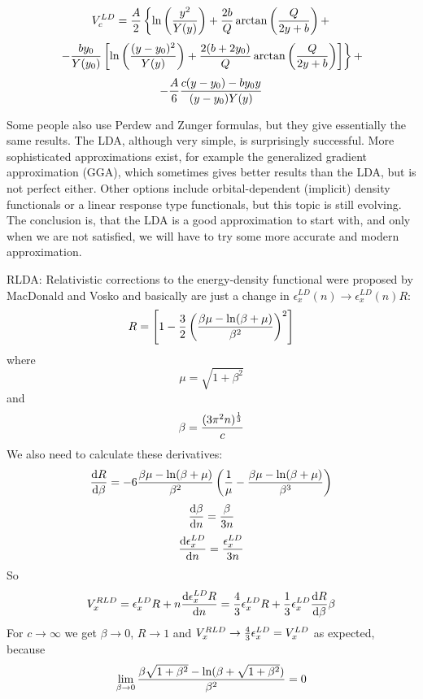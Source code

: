 \begin{equation*}
  V_c^{LD}={A\over2}\left\{ \ln\left(y^2\over Y(y)\right)+{2b\over Q}\arctan\left(Q\over 2y+b\right)+ \right.
\end{equation*}
\begin{equation*}
  \left. -{by_0\over Y(y_0)}\left[\ln\left((y-y_0)^2\over Y(y)\right) +{2(b+2y_0)\over Q}\arctan\left(Q\over 2y+b\right) \right] \right\}+
\end{equation*}
\begin{equation*}
  -{A\over6}{c(y-y_0)-by_0y\over (y-y_0)Y(y)}
\end{equation*}

Some people also use Perdew and Zunger formulas, but they give essentially the same results. The LDA, although very simple, is surprisingly successful. More sophisticated approximations exist, for example the generalized gradient approximation (GGA), which sometimes gives better results than the LDA, but is not perfect either. Other options include orbital-dependent (implicit) density functionals or a linear response type functionals, but this topic is still evolving. The conclusion is, that the LDA is a good approximation to start with, and only when we are not satisfied, we will have to try some more accurate and modern approximation.

RLDA: Relativistic corrections to the energy-density functional were proposed by MacDonald and Vosko and basically are just a change in $\epsilon_x^{LD}(n)\rightarrow\epsilon_x^{LD}(n)R$: 
\begin{equation*}
  R = \left[1-{3\over2}\left(\beta\mu-\ln(\beta+\mu)\over\beta^2\right)^2\right]
\end{equation*}
where 
\begin{equation*}
  \mu=\sqrt{1+\beta^2}
\end{equation*}
and 
\begin{equation*}
  \beta={(3\pi^2n)^{1\over3}\over c}
\end{equation*}
We also need to calculate these derivatives: 
\begin{equation*}
  {{\rm d}R\over{\rm d}\beta}= -6{\beta\mu-\ln(\beta+\mu)\over\beta^2}\left({1\over\mu}- {\beta\mu-\ln(\beta+\mu)\over\beta^3}\right)
\end{equation*}
\begin{equation*}
  {{\rm d}\beta\over{\rm d}n}={\beta\over 3n}
\end{equation*}
\begin{equation*}
  {{\rm d}\epsilon_x^{LD}\over{\rm d}n}={\epsilon_x^{LD}\over 3n}
\end{equation*}
So 
\begin{equation}
  V_x^{RLD}=\epsilon_x^{LD}R+n{{\rm d} \epsilon_x^{LD}R\over{\rm d} n}=
  {4\over3}\epsilon_x^{LD}R+{1\over3}\epsilon_x^{LD}{{\rm d} R\over{\rm d}\beta}\beta
  \label{RLDA}
\end{equation}
For $c\to\infty$ we get $\beta\to0$, $R\to1$ and $V_x^{RLD}\to {4\over3}\epsilon_x^{LD}=V_x^{LD}$ as expected, because 
\begin{equation*}
  \lim_{\beta\to0}{\beta\sqrt{1+\beta^2}-\ln(\beta+\sqrt{1+\beta^2})\over \beta^2} = 0
\end{equation*}

